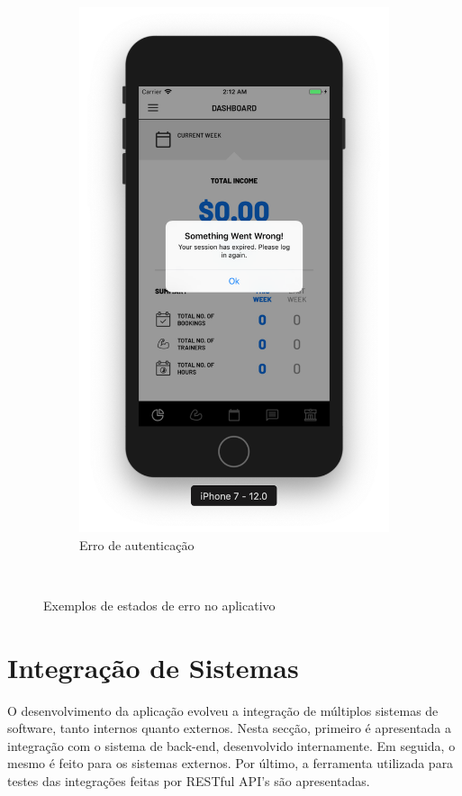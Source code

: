 \begin{figure}[H]
\begin{subfigure}[b]{0.4\textwidth}
        \includegraphics[width=\textwidth]{pfc/figuras/session-expired.png}
        \caption{Erro de autenticação}
        \label{fig:session-expired}
    \end{subfigure}
    ~
    \caption{Exemplos de estados de erro no aplicativo}
    \label{fig:error-states}
\end{figure}

\section{Integração de Sistemas}
O desenvolvimento da aplicação evolveu a integração de múltiplos sistemas de software, tanto internos quanto externos. Nesta secção, primeiro é apresentada a integração com o sistema de back-end, desenvolvido internamente. Em seguida, o mesmo é feito para os sistemas externos. Por último, a ferramenta utilizada para testes das integrações feitas por RESTful API's são apresentadas. 

